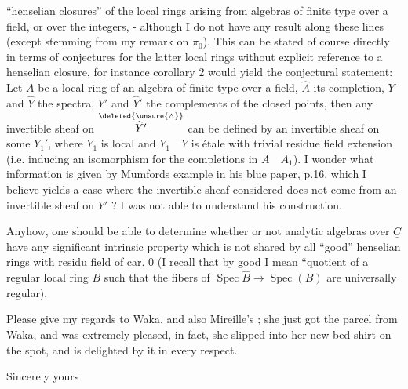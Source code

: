 
``henselian closures'' of the local rings arising from algebras of finite type over a field, or over the integers, - although I do not have any result along these lines (except  stemming from my remark on $\pi_0$).  This can be stated of course directly in terms of conjectures for the latter local rings without explicit reference to a henselian closure, for instance corollary 2 would yield the conjectural statement: Let $A$ be a local  ring of an algebra of finite type over a field, $\widehat{A}$ its completion, $Y$ and $\widehat{Y}$ the spectra, $Y'$ and $\widehat{Y}'$ the complements of the closed points,  then any invertible sheaf on $\overset{\deleted{\unsure{\wedge}}}{\widehat{Y}'}$ can be defined by an invertible sheaf on some $Y_1'$, where $Y_1$ is local and $Y_1\quad Y$ is étale with trivial residue field extension (i.e. inducing an isomorphism for the completions in $A\quad A_1$). I wonder what information is given by Mumfords example in his blue paper, p.16, which I believe yields a case where the invertible sheaf considered does not come from an invertible sheaf on $Y'$ ? I  was not able to understand his construction.

Anyhow, one should be able to determine whether or not  analytic algebras over $\underline{C}$ have any significant intrinsic property which is not shared by all ``good'' henselian rings with residu field of car. 0 (I recall that by good I mean ``quotient of a regular local ring $B$ such that the fibers of $\operatorname{Spec}\widehat{B}\rightarrow\operatorname{Spec}(B)$ are universally regular).

Please give my regards to Waka, and also Mireille's ; she just got the parcel from Waka, and was extremely pleased, in fact, she slipped into her new bed-shirt on the spot, and is delighted by it in every respect.

Sincerely yours

